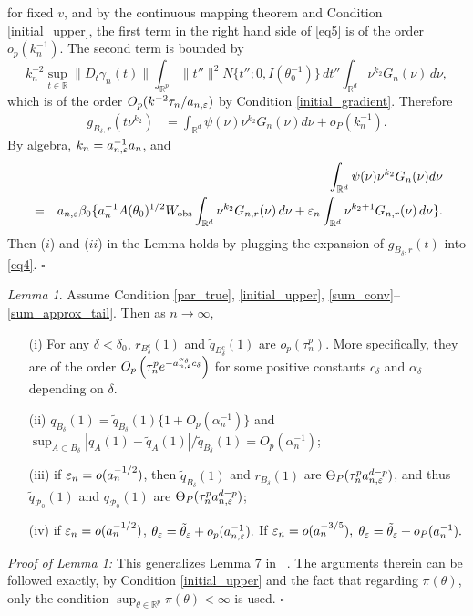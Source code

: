 \documentclass[9pt]{article}
\theoremstyle{remark}
\newtheorem{lemma}{Lemma}
\begin{document}
	for fixed $v$, and by the continuous mapping theorem and Condition \ref{initial_upper}, the
	first term in the right hand side of \eqref{eq5} is of the order
	$o_{p}(k_{n}^{-1})$. The second term is bounded by 
	\[
	k_{n}^{-2}\sup_{t\in\mathbb{R}}\|D_{t}\gamma_{n}(t)\|\int_{\mathbb{R}^{p}}\|t''\|^{2}N\{t'';0,I(\theta_{0}^{-1})\}\,dt''\int_{\mathbb{R}^{d}}\nu^{k_{2}}G_{n}(\nu)\,d\nu,
	\]
	which is of the order $O_{p}(k^{-2}\tau_{n}/a_{n,\varepsilon})$ by Condition \ref{initial_gradient}.
	Therefore 
	\begin{align}
	g_{B_{\delta},r}(t\nu^{k_{2}}) & =\int_{\mathbb{R}^{d}}\psi(\nu)\nu^{k_{2}}G_{n}(\nu)d\nu+o_{P}(k_{n}^{-1}).\label{eq6}
	\end{align}
	By algebra, $k_{n}=a_{n,\varepsilon}^{-1}a_{n}$, and 
	\begin{eqnarray}
	&  & \int_{\mathbb{R}^{d}}\psi(\nu)\nu^{k_{2}}G_{n}(\nu)d\nu\nonumber \\
	& = & a_{n,\varepsilon}\beta_{0}\{a_{n}^{-1}A(\theta_{0})^{1/2}W_{\rm obs}\int_{\mathbb{R}^{d}}\nu^{k_{2}}G_{n,r}(\nu)\,d\nu+\varepsilon_{n}\int_{\mathbb{R}^{d}}\nu^{k_{2}+1}G_{n,r}(\nu)\,d\nu\}.\label{eq7}
	\end{eqnarray}
	Then ($i$) and ($ii$) in the Lemma holds by plugging the expansion
	of $g_{B_{\delta},r}(t)$ into \eqref{eq4}.
	\hfill{$\square$} 
	
\pagebreak 
\begin{lemma}\label{Alemma3.5} Assume Condition \ref{par_true}, \ref{initial_upper}, \ref{sum_conv}--\ref{sum_approx_tail}. Then as $n\rightarrow\infty$, 
	\begin{enumerate}
		\item[(i)] For any $\delta<\delta_{0}$, $r_{B_{\delta}^{c}}(1)$ and $\tilde{q}_{B_{\delta}^{c}}(1)$
		are $o_{p}(\tau_{n}^{p})$. More specifically, they are of the order
		$O_{p}\left(\tau_{n}^{p}e^{-a_{n,\varepsilon}^{\alpha_{\delta}}c_{\delta}}\right)$
		for some positive constants $c_{\delta}$ and $\alpha_{\delta}$ depending
		on $\delta$.
		\item[(ii)] $q_{B_{\delta}}(1)=\tilde{q}_{B_{\delta}}(1)\{1+O_{p}(\alpha_{n}^{-1})\}$
		and $\sup_{A\subset B_{\delta}}|q_{A}(1)-\tilde{q}_{A}(1)|/\tilde{q}_{B_{\delta}}(1)=O_{p}(\alpha_{n}^{-1})$; 
		\item[(iii)] if $\varepsilon_{n}=o(a_{n}^{-1/2})$, then $\tilde{q}_{B_{\delta}}(1)$ and
		$r_{B_{\delta}}(1)$ are $\Theta_{P}(\tau_{n}^{p}a_{n,\varepsilon}^{d-p})$,
		and thus $\tilde{q}_{\mathcal{P}_{0}}(1)$ and $q_{\mathcal{P}_{0}}(1)$
		are $\Theta_{P}(\tau_{n}^{p}a_{n,\varepsilon}^{d-p})$; 
		\item[(iv)] if $\varepsilon_{n}=o(a_{n}^{-1/2})$, $\theta_{\varepsilon}=\tilde{\theta}_{\varepsilon}+o_{p}(a_{n,\varepsilon}^{-1}).$
		If $\varepsilon_{n}=o(a_{n}^{-3/5}),$ $\theta_{\varepsilon}=\tilde{\theta}_{\varepsilon}+o_{P}(a_{n}^{-1}).$
	\end{enumerate} \end{lemma}
{\it Proof of Lemma \ref{Alemma3.5}:} 
	This generalizes Lemma 7 in ~\cite{Li2017}. The arguments therein
	can be followed exactly, by Condition \ref{initial_upper} and the fact that regarding $\pi(\theta)$,
	only the condition $\sup_{\theta\in\mathbb{R}^{p}}\pi(\theta)<\infty$
	is used.
	\hfill{$\square$} 
	
\end{document}
